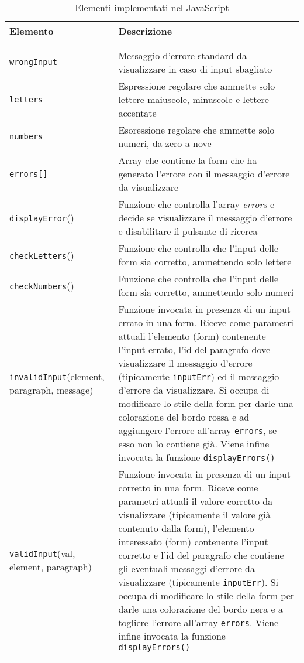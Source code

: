 \begin{center}
	\begin{longtable}{| m{} | m{} |} \hline
	\rowcolor{red!50!blue!40!white}
	\textbf{Elemento}&\textbf{Descrizione}\\ \hline 
	\endfirsthead
	\rowcolor{white}
	\multicolumn{2}{|r|}{\textit{-- continuazione da pagina precedente}} \\ \hline 
	\endhead
	\hline
	\rowcolor{white} 
	\multicolumn{2}{|r|}{{\textit{-- continua a pagina successiva}}} \\
	\endfoot
	\endlastfoot
	\texttt{wrongInput} & Messaggio d'errore standard da visualizzare in caso di input sbagliato\\ 
	\texttt{letters} & Espressione regolare che ammette solo lettere maiuscole, minuscole e lettere accentate\\
	\texttt{numbers} & Esoressione regolare che ammette solo numeri, da zero a nove\\
	\texttt{errors[]} & Array che contiene la form che ha generato l'errore con il messaggio d'errore da visualizzare\\
	\texttt{displayError}() & Funzione che controlla l'array \textit{errors} e decide se visualizzare il messaggio d'errore e disabilitare il pulsante di ricerca\\
	\texttt{checkLetters}() & Funzione che controlla che l'input delle form sia corretto, ammettendo solo lettere\\
	\texttt{checkNumbers}() & Funzione che controlla che l'input delle form sia corretto, ammettendo solo numeri\\
	\texttt{invalidInput}(element, paragraph, message) & Funzione invocata in presenza di un input errato in una form. Riceve come parametri attuali l'elemento (form) contenente l'input errato, l'id del paragrafo dove visualizzare il messaggio d'errore (tipicamente \texttt{inputErr}) ed il messaggio d'errore da visualizzare. Si occupa di modificare lo stile della form per darle una colorazione del bordo rossa e ad aggiungere l'errore all'array \texttt{errors}, se esso non lo contiene già. Viene infine invocata la funzione \texttt{displayErrors()}\\
	\texttt{validInput}(val, element, paragraph) & Funzione invocata in presenza di un input corretto in una form. Riceve come parametri attuali il valore corretto da visualizzare (tipicamente il valore già contenuto dalla form), l'elemento interessato (form) contenente l'input corretto e l'id del paragrafo che contiene gli eventuali messaggi d'errore da visualizzare (tipicamente \texttt{inputErr}). Si occupa di modificare lo stile della form per darle una colorazione del bordo nera e a togliere l'errore all'array \texttt{errors}. Viene infine invocata la funzione \texttt{displayErrors()}\\ \hline
	\rowcolor{white}
	\caption{Elementi implementati nel JavaScript}
	\end{longtable}
\end{center} 